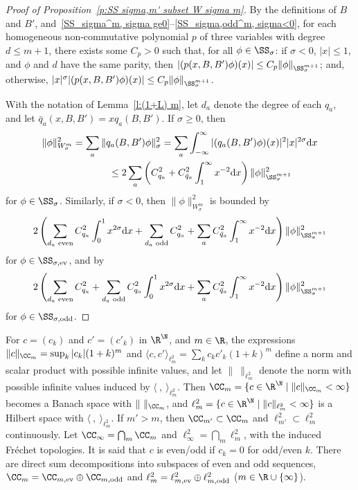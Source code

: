 \begin{proof}[Proof of Proposition~\ref{p:SS sigma,m' subset W sigma m}]
  By the def\/initions of $B$ and $B'$, and~\eqref{SS_sigma^m, sigma ge0}--\eqref{SS_sigma,odd^m, sigma<0}, for each homogeneous non-commutative polynomial $p$ of three variables with degree $d\le m+1$, there exists some $C_p>0$ such that, for all $\phi\in\SS_\sigma$: if $\sigma<0$, $|x|\le1$, and $\phi$ and $d$ have the same parity, then $|(p(x,B,B')\phi)(x)|\le C_p \|\phi\|_{\SS_\sigma^{m+1}}$; and, otherwise, $|x|^\sigma |(p(x,B,B')\phi)(x)|\le C_p \|\phi\|_{\SS_\sigma^{m+1}}$.

  With the notation of Lemma~\ref{l:(1+L) m}, let $d_a$ denote the degree of each $q_a$, and let $\bar q_a(x,B,B')=x q_a(B,B')$. If $\sigma\ge0$, then
    \begin{gather*}
      \|\phi\|_{W_\sigma^m}^2=\sum_a\|q_a(B,B')\phi\|_\sigma^2
      =\sum_a\int_{-\infty}^\infty|(q_a(B,B')\phi)(x)|^2 |x|^{2\sigma}{\rm d}x\\
\hphantom{\|\phi\|_{W_\sigma^m}^2=}{} \le 2\sum_a\left(C_{q_a}^2+C_{\bar q_a}^2\int_1^\infty x^{-2}{\rm d}x\right)\|\phi\|_{\SS_\sigma^{m+1}}^2
    \end{gather*}
for $\phi\in\SS_\sigma$. Similarly, if $\sigma<0$, then $\|\phi\|_{W_\sigma^m}^2$ is bounded by
    \[
      2\left(\sum_{\text{\rm$d_a$ even}}C_{q_a}^2\int_0^1x^{2\sigma}{\rm d}x
      +\sum_{\text{\rm$d_a$ odd}}C_{q_a}^2+\sum_aC_{\bar q_a}^2\int_1^\infty x^{-2}{\rm d}x\right)\|\phi\|_{\SS_\sigma^{m+1}}^2
    \]
   for $\phi\in\SS_{\sigma,\text{\rm ev}}$, and by
     \[
      2\left(\sum_{\text{\rm$d_a$ even}}C_{q_a}^2+\sum_{\text{\rm$d_a$ odd}}C_{q_a}^2\int_0^1x^{2\sigma}{\rm d}x
      +\sum_aC_{\bar q_a}^2\int_1^\infty x^{-2}{\rm d}x\right)\|\phi\|_{\SS_\sigma^{m+1}}^2
    \]
  for $\phi\in\SS_{\sigma,\text{\rm odd}}$.
\end{proof}

For $c=(c_k)$ and $c'=(c'_k)$ in $\R^{\N}$, and $m\in\R$, the expressions $\|c\|_{\CC_m}=\sup_k|c_k|(1+k)^m$ and $\langle c,c'\rangle_{\ell^2_m}=\sum_kc_kc'_k(1+k)^m$ def\/ine a norm and scalar product with possible inf\/inite values, and let $\|\ \|_{\ell^2_m}$ denote the norm with possible inf\/inite values induced by $\langle\ ,\ \rangle_{\ell^2_m}$. Then $\CC_m=\{c\in\R^{\N}\mid\|c\|_{\CC_m}<\infty\}$ becomes a Banach space with $\|\ \|_{\CC_m}$, and $\ell^2_m=\{c\in\R^{\N}\mid\|c\|_{\ell^2_m}<\infty\}$ is a Hilbert space with $\langle\ ,\ \rangle_{\ell^2_m}$. If $m'>m$, then $\CC_{m'}\subset\CC_m$ and $\ell^2_{m'}\subset\ell^2_m$ continuously. Let $\CC_\infty=\bigcap_m\CC_m$ and $\ell^2_\infty=\bigcap_m\ell^2_m$, with the induced Fr\'echet topologies. It is said that $c$ is even/odd if $c_k=0$ for odd/even $k$. There are direct sum decompositions into subspaces of even and odd sequences, $\CC_m=\CC_{m,\text{\rm ev}}\oplus\CC_{m,\text{\rm odd}}$ and $\ell^2_m=\ell^2_{m,\text{\rm ev}}\oplus\ell^2_{m,\text{\rm odd}}$ ($m\in\R\cup\{\infty\}$).

